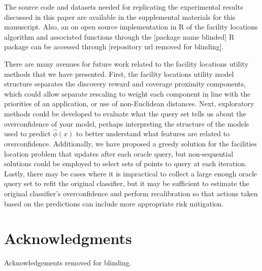 \documentclass[letterpaper]{article} %
\newcommand{\km}[1]{{\color{red} #1}} %
\begin{document}

The source code and datasets needed for replicating the experimental results discussed in this paper are available in the supplemental materials for this manuscript. Also, an on open source  implementation in R \citep{R} of the facility locations algorithm and associated functions through the [package name blinded] R package can be accessed through [repository url removed for blinding].

There are many avenues for future work related to the facility locations utility methods that we have presented. First, the facility locations utility model structure separates the discovery reward and coverage proximity components, which could allow separate rescaling to weight each component in line with the priorities of an application, or use of non-Euclidean distances. Next, exploratory methods could be developed to evaluate what the query set tells us about the overconfidence of your model, perhaps interpreting the structure of the models used to predict $\hat{\phi}(x)$ to better understand what features are related to overconfidence. Additionally, we have proposed a greedy solution for the facilities location problem that updates after each oracle query, but non-sequential solutions could be employed to select sets of points to query at each iteration. Lastly, there may be cases where it is impractical to collect a large enough oracle query set to refit the original classifier, but it may be sufficient to estimate the original classifier’s overconfidence and perform recalibration so that actions taken based on the predictions can include more appropriate risk mitigation. 

\section{Acknowledgments} 

Acknowledgements removed for blinding.







\end{document}

